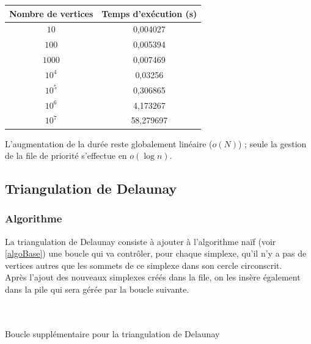 \documentclass{article}
\begin{document}
        \begin{center}
            \begin{tabular}{|c|c|}\hline \label{tempsBasique}
                Nombre de vertices & Temps d'exécution (s) \\
                \hline
                $10$ &  0,004027 \\
                $100$ & 0,005394 \\
                $1000$ & 0,007469 \\
                $10^4$ & 0,03256 \\
                $10^5$ & 0,306865 \\
                $10^6$ & 4,173267 \\
                $10^7$ & 58,279697\\
                \hline
            \end{tabular}
        \end{center}
        
        
        L'augmentation de la durée reste globalement linéaire ($o(N)$) ; seule la gestion de la file de priorité s'effectue en $o(\log{n})$.

    \subsection{Triangulation de Delaunay}
        \subsubsection{Algorithme}
        
        La triangulation de Delaunay consiste à ajouter à l'algorithme naïf (voir \ref{algoBase}) une boucle qui va contrôler, pour chaque simplexe, qu'il n'y a pas de vertices autres que les sommets de ce simplexe dans son cercle circonscrit.
        \\Après l'ajout des nouveaux simplexes créés dans la file, on les insère également dans la pile qui sera gérée par la boucle suivante.
        
        \paragraph{}
        \begin{algorithm}[H]
            \label{algoDelaunay}
             \\
            \caption{Boucle supplémentaire pour la triangulation de Delaunay}
       \end{algorithm}
       
\end{document}
